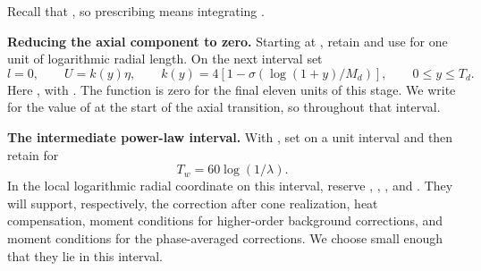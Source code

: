 Recall that , so prescribing
 means integrating
.

\noindent\textbf{Reducing the axial component to zero.} Starting at
, retain  and use
 for one unit of logarithmic radial length. On the
next interval set
\[
l=0,
\qquad U=k(y)\eta,
\qquad k(y)=4[1-\sigma(\log(1+y)/M_d)],
\qquad 0\le y\le T_d.
\]
Here , with
. The function
 is zero for the final eleven units of this stage. We write
 for the value of  at the start
of the axial transition, so  throughout that interval.

\noindent\textbf{The intermediate power-law interval.} With , set
 on a unit interval and then retain
 for
\begin{equation}
T_w=60\log(1/\lambda).
\tag{A.9}\label{eq:A.9}
\end{equation}
In the local logarithmic radial coordinate on this interval, reserve
,
,
, and
. They will support, respectively, the correction after cone
realization, heat compensation, moment conditions for higher-order background corrections, and
moment conditions for the phase-averaged corrections. We choose
 small enough that they lie in this interval.

